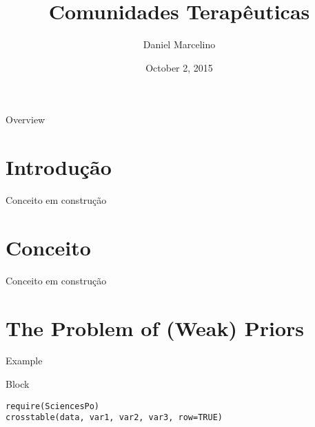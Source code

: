 

\title{Comunidades Terapêuticas}
\subtitle{}
\date{October 2, 2015}
\author{Daniel Marcelino}

\usepackage{Sweave}



\maketitle
\AtBeginSection{\frame{\sectionpage}}

\begin{frame}{Overview}
\tableofcontents
\end{frame}

\section{Introdução}
\begin{frame}{Conceito em construção}

\end{frame}

\section{Conceito}
\begin{frame}{Conceito em construção}

\end{frame}

\section{The Problem of (Weak) Priors}

\begin{frame}
\begin{exampleblock}{Example}

\end{exampleblock}

\end{frame}

\begin{frame}
\begin{block}{Block}

\end{block}

\end{frame}


\appendix

\backupbegin

\begin{frame}[fragile]

\begin{lstlisting}
require(SciencesPo)
crosstable(data, var1, var2, var3, row=TRUE)
\end{lstlisting}

\end{frame}

\backupend



